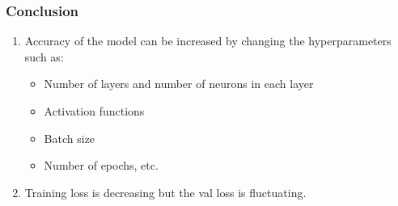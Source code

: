 \documentclass{beamer}
\begin{document}
\begin{frame}
\frametitle{Conclusion}

\begin{enumerate}
 
 \item Accuracy of the model can be increased by changing the hyperparameters such as:
 
 \begin{itemize}
    \item Number of layers and number of neurons in each layer
    \item Activation functions
    \item Batch size
    \item Number of epochs, etc.
    
    \end{itemize}
    
    \item Training loss is decreasing but the val loss is fluctuating.
 
\end{enumerate}

\end{frame}
\end{document}

